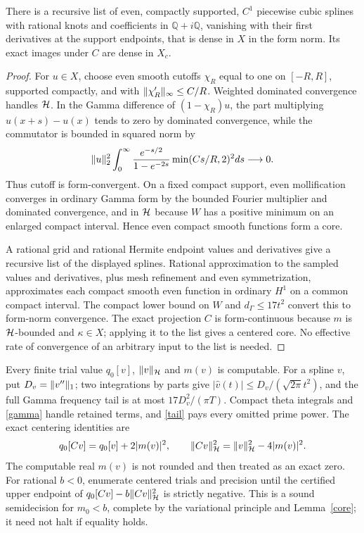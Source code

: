 \documentclass[11pt]{article}
\begin{document}
\begin{lemma}\label{core}
There is a recursive list of even, compactly supported, $C^1$ piecewise cubic splines with rational knots and coefficients in $\mathbb Q+i\mathbb Q$, vanishing with their first derivatives at the support endpoints, that is dense in $X$ in the form norm. Its exact images under $C$ are dense in $X_c$.
\end{lemma}
\begin{proof}
For $u\in X$, choose even smooth cutoffs $\chi_R$ equal to one on $[-R,R]$, supported compactly, and with $\lVert\chi_R'\rVert_\infty\le C/R$. Weighted dominated convergence handles $\mathcal H$. In the Gamma difference of $(1-\chi_R)u$, the part multiplying $u(x+s)-u(x)$ tends to zero by dominated convergence, while the commutator is bounded in squared norm by
\[\lVert u\rVert_2^2\int_0^\infty\frac{e^{-s/2}}{1-e^{-2s}}\min(Cs/R,2)^2ds\longrightarrow0.
\]
Thus cutoff is form-convergent. On a fixed compact support, even mollification converges in ordinary Gamma form by the bounded Fourier multiplier and dominated convergence, and in $\mathcal H$ because $W$ has a positive minimum on an enlarged compact interval. Hence even compact smooth functions form a core.

A rational grid and rational Hermite endpoint values and derivatives give a recursive list of the displayed splines. Rational approximation to the sampled values and derivatives, plus mesh refinement and even symmetrization, approximates each compact smooth even function in ordinary $H^1$ on a common compact interval. The compact lower bound on $W$ and $d_\Gamma\le17t^2$ convert this to form-norm convergence. The exact projection $C$ is form-continuous because $m$ is $\mathcal H$-bounded and $\kappa\in X$; applying it to the list gives a centered core. No effective rate of convergence of an arbitrary input to the list is needed.
\end{proof}
Every finite trial value $q_0[v]$, $\lVert v\rVert_{\mathcal H}$ and $m(v)$ is computable. For a spline $v$, put $D_v=\lVert v''\rVert_1$; two integrations by parts give $|\widehat v(t)|\le D_v/(\sqrt{2\pi}t^2)$, and the full Gamma frequency tail is at most $17D_v^2/(\pi T)$. Compact theta integrals and \eqref{gamma} handle retained terms, and \eqref{tail} pays every omitted prime power. The exact centering identities are
\begin{equation}\label{centering}
 q_0[Cv]=q_0[v]+2|m(v)|^2,\qquad \lVert Cv\rVert_{\mathcal H}^2=\lVert v\rVert_{\mathcal H}^2-4|m(v)|^2.
\end{equation}
The computable real $m(v)$ is not rounded and then treated as an exact zero. For rational $b<0$, enumerate centered trials and precision until the certified upper endpoint of $q_0[Cv]-b\lVert Cv\rVert_{\mathcal H}^2$ is strictly negative. This is a sound semidecision for $m_0<b$, complete by the variational principle and Lemma~\ref{core}; it need not halt if equality holds.
\end{document}
